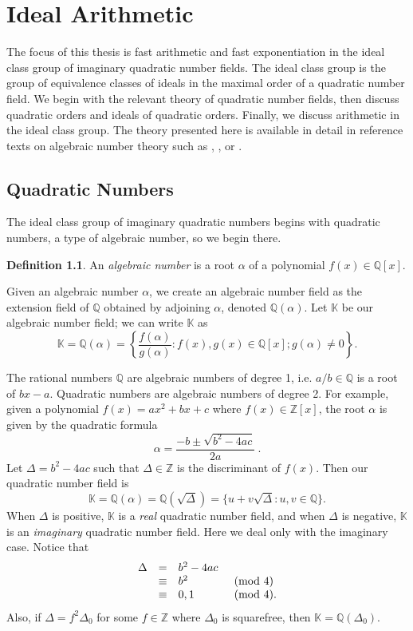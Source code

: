 \documentclass{ucalgthes1}
\theoremstyle{plain}
\theoremstyle{definition}
\newtheorem{defn}[thm]{Definition}
\newcommand{\KK}{\mathbb{K}}
\newcommand{\ZZ}{\mathbb{Z}}
\newcommand{\QQ}{\mathbb{Q}}
\begin{document}
\setcounter{chapter}{1}
\chapter{Ideal Arithmetic}

The focus of this thesis is fast arithmetic and fast exponentiation in the ideal class group of imaginary quadratic number fields.  The ideal class group is the group of equivalence classes of ideals in the maximal order of a quadratic number field.   We begin with the relevant theory of quadratic number fields, then discuss quadratic orders and ideals of quadratic orders.  Finally, we discuss arithmetic in the ideal class group.  The theory presented here is available in detail in reference texts on algebraic number theory such as \cite{IR90}, \cite{Hua82}, or \cite{Coh80}. 



\section{Quadratic Numbers}

The ideal class group of imaginary quadratic numbers begins with quadratic numbers, a type of algebraic number, so we begin there.   

\begin{defn}
An \emph{algebraic number} is a root $\alpha$ of a polynomial $f(x) \in \QQ[x]$.
\end{defn}

\noindent
Given an algebraic number $\alpha$, we create an algebraic number field as the extension field of $\QQ$ obtained by adjoining $\alpha$, denoted $\QQ(\alpha)$. Let $\KK$ be our algebraic number field; we can write $\KK$ as
\[
	\KK = \QQ(\alpha) = \left\{ \frac{f(\alpha)}{g(\alpha)} : f(x), g(x) \in \QQ[x]; g(\alpha) \ne 0 \right\}.
\]

\noindent
The rational numbers $\QQ$ are algebraic numbers of degree 1, i.e. $a/b \in \QQ$ is a root of $bx - a$.  Quadratic numbers are algebraic numbers of degree 2.  For example, given a polynomial $f(x) = ax^2 + bx + c$ where $f(x) \in \ZZ[x]$, the root $\alpha$ is given by the quadratic formula
\[
	\alpha = \frac{-b \pm \sqrt{b^2 - 4ac}}{2a} ~.
\]
Let $\Delta = b^2 -4ac$ such that $\Delta \in \ZZ$ is the discriminant of $f(x)$.  Then our quadratic number field is 
\[
	\KK = \QQ(\alpha) = \QQ(\sqrt{\Delta}) = \{u + v\sqrt{\Delta} : u,v \in \QQ\}.
\]
When $\Delta$ is positive, $\KK$ is a \emph{real} quadratic number field, and when $\Delta$ is negative, $\KK$ is an \emph{imaginary} quadratic number field.  Here we deal only with the imaginary case.  Notice that
\begin{eqnarray*}
\begin{array}{l l l l}
	\Delta & = & b^2-4ac & \\
	& \equiv & b^2 & \pmod 4 \\
	& \equiv & 0,1 & \pmod 4.
\end{array}
\end{eqnarray*}
Also, if $\Delta = f^2 \Delta_0$ for some $f \in \ZZ$ where $\Delta_0$ is squarefree, then $\KK = \QQ(\Delta_0)$.
\end{document}
